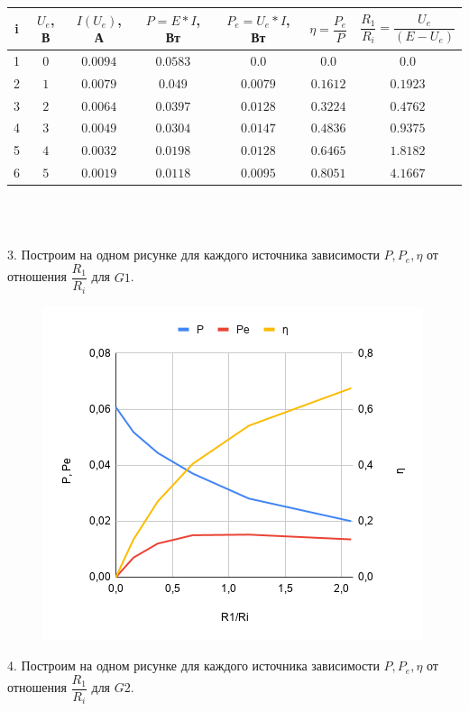 \begin{tabular}{|c|c|c|c|c|c|c|}
    \hline
    i & $ U_e $, В & $ I(U_e) $, А & $ P = E*I $, Вт & $ P_e = U_e*I $, Вт & $ \eta = \dfrac{P_e}{P} $ & $ \dfrac{R_1}{R_i} = \dfrac{U_e}{(E - U_e)} $\\
    \hline
    1 & $ 0 $ & $ 0.0094 $ & $ 0.0583 $ & $ 0.0 $ & $ 0.0 $ & $ 0.0 $\\
    \hline
    2 & $ 1 $ & $ 0.0079 $ & $ 0.049 $ & $ 0.0079 $ & $ 0.1612 $ & $ 0.1923 $\\
    \hline
    3 & $ 2 $ & $ 0.0064 $ & $ 0.0397 $ & $ 0.0128 $ & $ 0.3224 $ & $ 0.4762 $\\
    \hline
    4 & $ 3 $ & $ 0.0049 $ & $ 0.0304 $ & $ 0.0147 $ & $ 0.4836 $ & $ 0.9375 $\\
    \hline
    5 & $ 4 $ & $ 0.0032 $ & $ 0.0198 $ & $ 0.0128 $ & $ 0.6465 $ & $ 1.8182 $\\
    \hline
    6 & $ 5 $ & $ 0.0019 $ & $ 0.0118 $ & $ 0.0095 $ & $ 0.8051 $ & $ 4.1667 $\\
    \hline
\end{tabular}
\\
\\

\newpage

3. Построим на одном рисунке для каждого источника зависимости 
$ P, P_e, \eta $ от отношения $ \dfrac{R_1}{R_i} $ для $ G1 $.

\begin{figure}[hpt!]
    \centering
    \includegraphics[width=0.6\linewidth]{photo/chart_g1}
\end{figure}

4. Построим на одном рисунке для каждого источника зависимости 
$ P, P_e, \eta $ от отношения $ \dfrac{R_1}{R_i} $ для $ G2 $.

